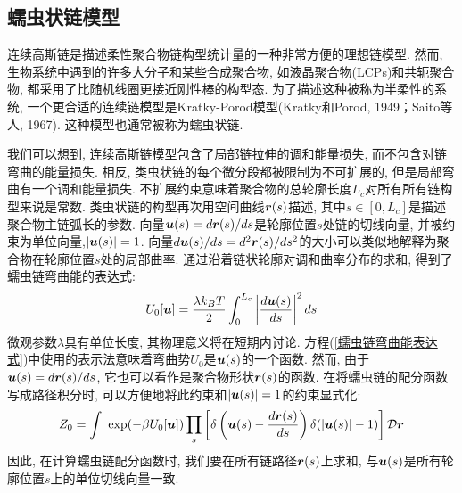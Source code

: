 \subsection{蠕虫状链模型}
\begin{center}
\author{王鑫}
\end{center}
\qquad 连续高斯链是描述柔性聚合物链构型统计量的一种非常方便的理想链模型. 然而, 生物系统中遇到的许多大分子和某些合成聚合物, 如液晶聚合物(LCPs)和共轭聚合物, 都采用了比随机线圈更接近刚性棒的构型态. 为了描述这种被称为半柔性的系统, 一个更合适的连续链模型是Kratky-Porod模型(Kratky和Porod, 1949；Saito等人, 1967). 这种模型也通常被称为蠕虫状链. 

我们可以想到, 连续高斯链模型包含了局部链拉伸的调和能量损失, 而不包含对链弯曲的能量损失. 相反, 类虫状链的每个微分段都被限制为不可扩展的, 但是局部弯曲有一个调和能量损失. 不扩展约束意味着聚合物的总轮廓长度$L_c$对所有所有链构型来说是常数. 类虫状链的构型再次用空间曲线$\bm{r}(s)$描述, 其中$s\in [0,L_c]$是描述聚合物主链弧长的参数. 向量$\bm{u}(s)=d\bm{r}(s)/ds$是轮廓位置$s$处链的切线向量, 并被约束为单位向量,$|\bm{u}(s)| =1$. 向量$d\bm{u}(s)/ds=d^2\bm{r}(s)/ds^2$的大小可以类似地解释为聚合物在轮廓位置$s$处的局部曲率. 通过沿着链状轮廓对调和曲率分布的求和, 得到了蠕虫链弯曲能的表达式:\\
\begin{equation}
	U_0[\bm{u}]=\frac{\lambda k_B T}{2}\int_{0}^{L_c}\left|\frac{d\bm{u}(s)}{ds}\right|^2 ds \label{蠕虫链弯曲能表达式}
\end{equation}
微观参数$\lambda$具有单位长度, 其物理意义将在短期内讨论. 方程(\ref{蠕虫链弯曲能表达式})中使用的表示法意味着弯曲势$U_0$是$\bm{u}(s)$的一个函数. 然而, 由于$\bm{u}(s)=d\bm{r}(s)/ds$, 它也可以看作是聚合物形状$\bm{r}(s)$的函数. 在将蠕虫链的配分函数写成路径积分时, 可以方便地将此约束和$|\bm{u}(s)|=1$的约束显式化:\\
\begin{equation}
	Z_0=\int\ \exp (-\beta U_0[\bm{u}])\prod_s\left[\delta\left(\bm{u}(s)-\frac{d\bm{r}(s)}{ds}\right)\delta(|\bm{u}(s)|-1)\right] \mathcal{D} \bm{r}\label{蠕虫链的配分函数加约束}
\end{equation}
因此, 在计算蠕虫链配分函数时, 我们要在所有链路径$\bm{r}(s)$上求和, 与$\bm{u}(s)$是所有轮廓位置$s$上的单位切线向量一致. \\

